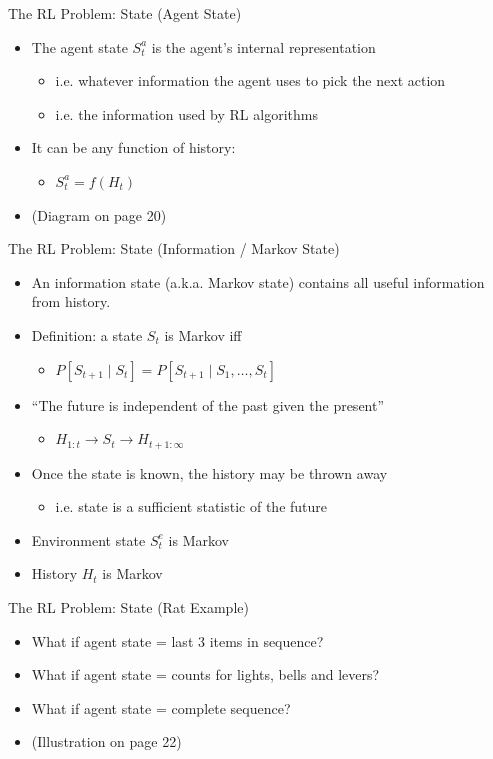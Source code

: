 \documentclass[presentation]{beamer}
\begin{document}
\begin{frame}[label={sec:org8707e7e}]{The RL Problem: State (Agent State)}
\begin{itemize}
\item The agent state \(S^a_t\) is the agent’s internal representation
\begin{itemize}
\item i.e. whatever information the agent uses to pick the next action
\item i.e. the information used by RL algorithms
\end{itemize}
\item It can be any function of history:
\begin{itemize}
\item \(S^a_t = f(H_t)\)
\end{itemize}
\item (Diagram on page 20)
\end{itemize}
\end{frame}
\begin{frame}[label={sec:org6f4e3f1}]{The RL Problem: State (Information / Markov State)}
\begin{itemize}
\item An information state (a.k.a. Markov state) contains all useful information from history.
\item Definition: a state \(S_t\) is Markov iff
\begin{itemize}
\item \(P[S_{t+1}\mid S_t] = P[S_{t+1}\mid S_1,\ldots,S_t]\)
\end{itemize}
\item “The future is independent of the past given the present”
\begin{itemize}
\item \(H_{1:t} \rightarrow S_t \rightarrow H_{t+1:\infty}\)
\end{itemize}
\item Once the state is known, the history may be thrown away
\begin{itemize}
\item i.e. state is a sufficient statistic of the future
\end{itemize}
\item Environment state \(S^e_t\) is Markov
\item History \(H_t\) is Markov
\end{itemize}
\end{frame}
\begin{frame}[label={sec:org39eea41}]{The RL Problem: State (Rat Example)}
\begin{itemize}
\item What if agent state = last 3 items in sequence?
\item What if agent state = counts for lights, bells and levers?
\item What if agent state = complete sequence?
\item (Illustration on page 22)
\end{itemize}
\end{frame}
\end{document}
